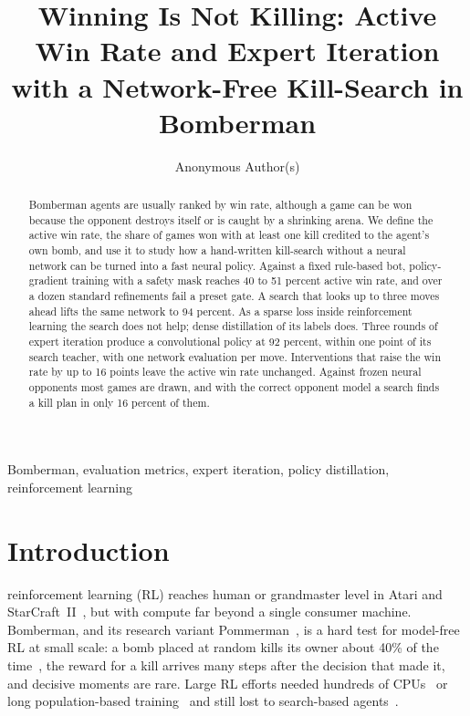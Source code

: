 \documentclass[journal]{IEEEtran}
\begin{document}
\title{Winning Is Not Killing: Active Win Rate and Expert Iteration with a Network-Free Kill-Search in Bomberman}

\author{Anonymous Author(s)}

\maketitle

\begin{abstract}
Bomberman agents are usually ranked by win rate, although a game can be won because the opponent destroys itself or is caught by a shrinking arena. We define the active win rate, the share of games won with at least one kill credited to the agent's own bomb, and use it to study how a hand-written kill-search without a neural network can be turned into a fast neural policy. Against a fixed rule-based bot, policy-gradient training with a safety mask reaches 40 to 51 percent active win rate, and over a dozen standard refinements fail a preset gate. A search that looks up to three moves ahead lifts the same network to 94 percent. As a sparse loss inside reinforcement learning the search does not help; dense distillation of its labels does. Three rounds of expert iteration produce a convolutional policy at 92 percent, within one point of its search teacher, with one network evaluation per move. Interventions that raise the win rate by up to 16 points leave the active win rate unchanged. Against frozen neural opponents most games are drawn, and with the correct opponent model a search finds a kill plan in only 16 percent of them.
\end{abstract}

\begin{IEEEkeywords}
Bomberman, evaluation metrics, expert iteration, policy distillation, reinforcement learning
\end{IEEEkeywords}

\section{Introduction}

 reinforcement learning (RL) reaches human or grandmaster level in Atari and StarCraft~II~\cite{mnih2015dqn,vinyals2019alphastar}, but with compute far beyond a single consumer machine. Bomberman, and its research variant Pommerman~\cite{resnick2018pommerman}, is a hard test for model-free RL at small scale: a bomb placed at random kills its owner about 40\% of the time~\cite{gao2019hard}, the reward for a kill arrives many steps after the decision that made it, and decisive moments are rare. Large RL efforts needed hundreds of CPUs~\cite{peng2018continual} or long population-based training~\cite{huynh2024} and still lost to search-based agents~\cite{osogami2019,huynh2024}.
\end{document}
